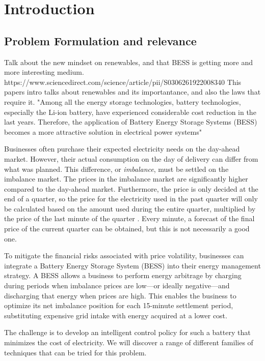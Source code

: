 \chapter{Introduction}
\label{chap:intro}

\section{Problem Formulation and relevance}

Talk about the new mindset on renewables, and that BESS is getting more and more interesting medium. 
https://www.sciencedirect.com/science/article/pii/S0306261922008340
This papers intro talks about renewables and its importantance, and also the laws that require it.
"Among all the energy storage technologies, battery technologies, 
especially the Li-ion battery, have experienced considerable cost 
reduction in the last years. Therefore, the application of Battery Energy 
Storage Systems (BESS) becomes a more attractive solution in electrical 
power systems"

Businesses often purchase their expected electricity needs on the day-ahead market. However, their actual consumption on the day of delivery can differ from what was planned. This difference, or \textit{imbalance}, must be settled on the imbalance market.  
The prices in the imbalance market are significantly higher compared to the day-ahead market. Furthermore, the price is only decided at the end of a quarter, so the price for the electricity used in the past quarter will only be calculated based on the amount used during the entire quarter, multiplied by the price of the last minute of the quarter . Every minute, a forecast of the final price of the current quarter can be obtained, but this is not necessarily a good one.

To mitigate the financial risks associated with price volatility, businesses can integrate a Battery Energy Storage System (BESS) into their energy management strategy. A BESS allows a business to perform energy arbitrage by charging during periods when imbalance prices are low—or ideally negative—and discharging that energy when prices are high. This enables the business to optimize its net imbalance position for each 15-minute settlement period, substituting expensive grid intake with energy acquired at a lower cost.

The challenge is to develop an intelligent control policy for such a battery that minimizes the cost of electricity. We will discover a range of different families of techniques that can be tried for this problem.

